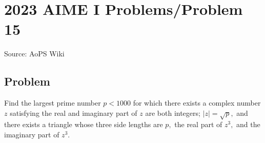\documentclass[12pt]{article}
\begin{document}
\section*{{2023 AIME I Problems/Problem 15}}
Source: AoPS Wiki

\subsection*{Problem}
Find the largest prime number $p<1000$ for which there exists a complex number $z$ satisfying the real and imaginary part of $z$ are both integers; $|z|=\sqrt{p},$ and there exists a triangle whose three side lengths are $p,$ the real part of $z^{3},$ and the imaginary part of $z^{3}.$
\end{document}
